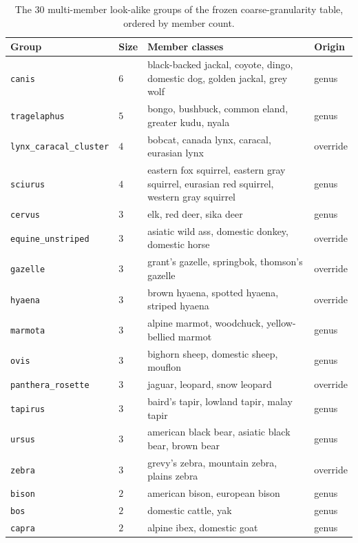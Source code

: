 \begin{table}[htbp]
\centering
\footnotesize
{}
\caption{The $30$ multi-member look-alike groups of the frozen coarse-granularity table, ordered by member count.}
\label{tab:appendix-lookalike-groups}
\begin{tabularx}{\textwidth}{@{}llXl@{}}
    \toprule
    Group & Size & Member classes & Origin \\
    \midrule
    \texttt{canis} & $6$ & black-backed jackal, coyote, dingo, domestic dog, golden jackal, grey wolf & genus \\
    \texttt{tragelaphus} & $5$ & bongo, bushbuck, common eland, greater kudu, nyala & genus \\
    \texttt{lynx\_caracal\_cluster} & $4$ & bobcat, canada lynx, caracal, eurasian lynx & override \\
    \texttt{sciurus} & $4$ & eastern fox squirrel, eastern gray squirrel, eurasian red squirrel, western gray squirrel & genus \\
    \texttt{cervus} & $3$ & elk, red deer, sika deer & genus \\
    \texttt{equine\_unstriped} & $3$ & asiatic wild ass, domestic donkey, domestic horse & override \\
    \texttt{gazelle} & $3$ & grant's gazelle, springbok, thomson's gazelle & override \\
    \texttt{hyaena} & $3$ & brown hyaena, spotted hyaena, striped hyaena & override \\
    \texttt{marmota} & $3$ & alpine marmot, woodchuck, yellow-bellied marmot & genus \\
    \texttt{ovis} & $3$ & bighorn sheep, domestic sheep, mouflon & genus \\
    \texttt{panthera\_rosette} & $3$ & jaguar, leopard, snow leopard & override \\
    \texttt{tapirus} & $3$ & baird's tapir, lowland tapir, malay tapir & genus \\
    \texttt{ursus} & $3$ & american black bear, asiatic black bear, brown bear & genus \\
    \texttt{zebra} & $3$ & grevy's zebra, mountain zebra, plains zebra & override \\
    \texttt{bison} & $2$ & american bison, european bison & genus \\
    \texttt{bos} & $2$ & domestic cattle, yak & genus \\
    \texttt{capra} & $2$ & alpine ibex, domestic goat & genus \\

\end{tabularx}
\end{table}
